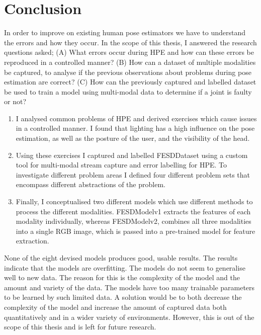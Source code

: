 \chapter{Conclusion}
\label{sec:conclusion}
In order to improve on existing human pose estimators we have to understand the errors and how they occur. In the scope of this thesis, I answered the research questions asked; (A) What errors occur during HPE and how can these errors be reproduced in a controlled manner? (B) How can a dataset of multiple modalities be captured, to analyse if the previous observations about problems during pose estimation are correct? (C) How can the previously captured and labelled dataset be used to train a model using multi-modal data to determine if a joint is faulty or not? 

\begin{enumerate}[label=\Alph*]
  \item I analysed common problems of HPE and derived exercises which cause issues in a controlled manner. I found that lighting has a high influence on the pose estimation, as well as the posture of the user, and the visibility of the head.
  \item Using these exercises I captured and labelled FESDDataset using a custom tool for multi-modal stream capture and error labelling for HPE. To investigate different problem areas I defined four different problem sets that encompass different abstractions of the problem. 
  \item Finally, I conceptualised two different models which use different methods to process the different modalities. FESDModelv1 extracts the features of each modality individually, whereas FESDModelv2, combines all three modalities into a single RGB image, which is passed into a pre-trained model for feature extraction.
\end{enumerate}

None of the eight devised models produces good, usable results. The results indicate that the models are overfitting. The models do not seem to generalise well to new data. The reason for this is the complexity of the model and the amount and variety of the data. The models have too many trainable parameters to be learned by such limited data. A solution would be to both decrease the complexity of the model and increase the amount of captured data both quantitatively and in a wider variety of environments. However, this is out of the scope of this thesis and is left for future research.

